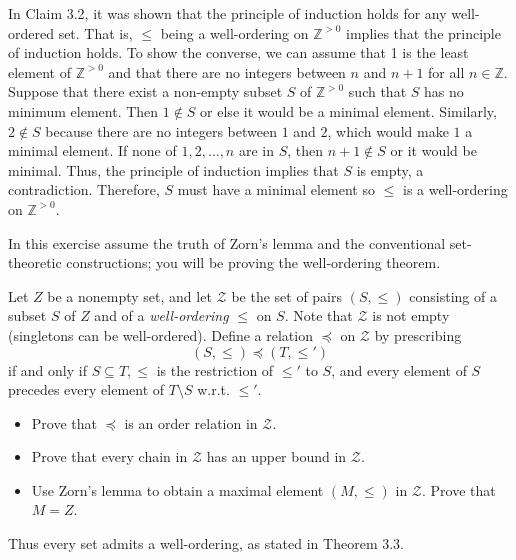 \documentclass[../../master.tex]{subfiles}
\begin{document}
    \begin{solution}
        In Claim 3.2, it was shown that the principle of induction holds for any
        well-ordered set. That is, $\leq$ being a well-ordering on
        $\mathbb{Z}^{> 0}$ implies that the principle of induction holds. To
        show the converse, we can assume that 1 is the least element of
        $\mathbb{Z}^{> 0}$ and that there are no integers between $n$ and $n +
        1$ for all $n \in \mathbb{Z}$. Suppose that there exist a non-empty
        subset $S$ of $\mathbb{Z}^{> 0}$ such that $S$ has no minimum element.
        Then $1 \notin S$ or else it would be a minimal element. Similarly, $2
        \notin S$ because there are no integers between $1$ and $2$, which would
        make $1$ a minimal element. If none of $1, 2, \ldots, n$ are in $S$,
        then $n + 1 \notin S$ or it would be minimal. Thus, the principle of
        induction implies that $S$ is empty, a contradiction. Therefore, $S$
        must have a minimal element so $\leq$ is a well-ordering on
        $\mathbb{Z}^{>0}$.
    \end{solution}

    \begin{problem}
        In this exercise assume the truth of Zorn's lemma and the conventional
        set-theoretic constructions; you will be proving the well-ordering
        theorem.

        Let $Z$ be a nonempty set, and let $\mathscr{Z}$ be the set of pairs
        $(S, \leq)$ consisting of a subset $S$ of $Z$ and of a
        \textit{well-ordering} $\leq$ on $S$. Note that $\mathscr{Z}$ is not
        empty (singletons can be well-ordered). Define a relation $\preceq$ on
        $\mathscr{Z}$ by prescribing
        \[
            (S, \leq) \preceq (T, \leq')
        \] 
        if and only if $S \subseteq T, \leq$ is the restriction of $\leq'$ to
        $S$, and every element of $S$ precedes every element of $T \setminus S$
        w.r.t.  $\leq'$.
        \begin{itemize}
            \item Prove that $\preceq$ is an order relation in $\mathscr{Z}$.
            \item Prove that every chain in $\mathscr{Z}$ has an upper bound in
                $\mathscr{Z}$.
            \item Use Zorn's lemma to obtain a maximal element $(M, \leq)$ in
                $\mathscr{Z}$. Prove that $M = Z$.
        \end{itemize}
        Thus every set admits a well-ordering, as stated in Theorem 3.3.
    \end{problem}
\end{document}
